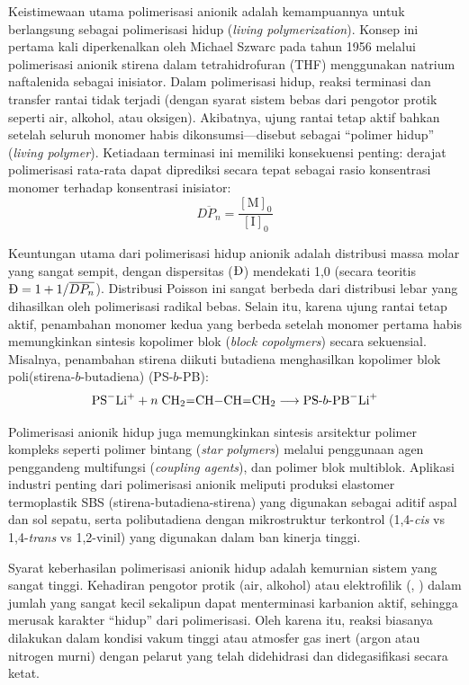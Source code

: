 \documentclass[12pt,a4paper,openany]{book}
\begin{document}
Keistimewaan utama polimerisasi anionik adalah kemampuannya untuk berlangsung sebagai polimerisasi hidup (\textit{living polymerization}). Konsep ini pertama kali diperkenalkan oleh Michael Szwarc pada tahun 1956 melalui polimerisasi anionik stirena dalam tetrahidrofuran (THF) menggunakan natrium naftalenida sebagai inisiator. Dalam polimerisasi hidup, reaksi terminasi dan transfer rantai tidak terjadi (dengan syarat sistem bebas dari pengotor protik seperti air, alkohol, atau oksigen). Akibatnya, ujung rantai tetap aktif bahkan setelah seluruh monomer habis dikonsumsi---disebut sebagai ``polimer hidup'' (\textit{living polymer}). Ketiadaan terminasi ini memiliki konsekuensi penting: derajat polimerisasi rata-rata dapat diprediksi secara tepat sebagai rasio konsentrasi monomer terhadap konsentrasi inisiator:
\begin{equation}
  \overline{DP_n} = \frac{[\text{M}]_0}{[\text{I}]_0}
\end{equation}

Keuntungan utama dari polimerisasi hidup anionik adalah distribusi massa molar yang sangat sempit, dengan dispersitas ($\text{\DH}$) mendekati 1,0 (secara teoritis $\text{\DH} = 1 + 1/\overline{DP_n}$). Distribusi Poisson ini sangat berbeda dari distribusi lebar yang dihasilkan oleh polimerisasi radikal bebas. Selain itu, karena ujung rantai tetap aktif, penambahan monomer kedua yang berbeda setelah monomer pertama habis memungkinkan sintesis kopolimer blok (\textit{block copolymers}) secara sekuensial. Misalnya, penambahan stirena diikuti butadiena menghasilkan kopolimer blok poli(stirena-$b$-butadiena) (PS-$b$-PB):
\begin{equation}
  \text{PS}^-\ce{Li^+} + n\;\ce{CH2=CH-CH=CH2} \longrightarrow \text{PS-}b\text{-PB}^-\ce{Li^+}
\end{equation}

Polimerisasi anionik hidup juga memungkinkan sintesis arsitektur polimer kompleks seperti polimer bintang (\textit{star polymers}) melalui penggunaan agen penggandeng multifungsi (\textit{coupling agents}), dan polimer blok multiblok. Aplikasi industri penting dari polimerisasi anionik meliputi produksi elastomer termoplastik SBS (stirena-butadiena-stirena) yang digunakan sebagai aditif aspal dan sol sepatu, serta polibutadiena dengan mikrostruktur terkontrol (1,4-\textit{cis} vs 1,4-\textit{trans} vs 1,2-vinil) yang digunakan dalam ban kinerja tinggi.

Syarat keberhasilan polimerisasi anionik hidup adalah kemurnian sistem yang sangat tinggi. Kehadiran pengotor protik (air, alkohol) atau elektrofilik (, ) dalam jumlah yang sangat kecil sekalipun dapat menterminasi karbanion aktif, sehingga merusak karakter ``hidup'' dari polimerisasi. Oleh karena itu, reaksi biasanya dilakukan dalam kondisi vakum tinggi atau atmosfer gas inert (argon atau nitrogen murni) dengan pelarut yang telah didehidrasi dan didegasifikasi secara ketat.
\end{document}
